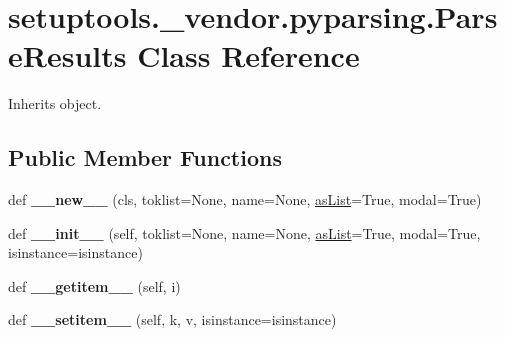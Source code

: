 \hypertarget{classsetuptools_1_1__vendor_1_1pyparsing_1_1_parse_results}{}\section{setuptools.\+\_\+vendor.\+pyparsing.\+Parse\+Results Class Reference}
\label{classsetuptools_1_1__vendor_1_1pyparsing_1_1_parse_results}


Inherits object.

\subsection*{Public Member Functions}
\begin{DoxyCompactItemize}
\item 
\mbox{\label{classsetuptools_1_1__vendor_1_1pyparsing_1_1_parse_results_a985e66ffeff9506a81ed9b13fee5f686}} 
def {\bfseries \+\_\+\+\_\+new\+\_\+\+\_\+} (cls, toklist=None, name=None, \hyperlink{classsetuptools_1_1__vendor_1_1pyparsing_1_1_parse_results_a8d1cc9ef72b2fcf972c240eae0e59e87}{as\+List}=True, modal=True)
\item 
\mbox{\label{classsetuptools_1_1__vendor_1_1pyparsing_1_1_parse_results_a7d7a395036e3c5e696230f1229bef36e}} 
def {\bfseries \+\_\+\+\_\+init\+\_\+\+\_\+} (self, toklist=None, name=None, \hyperlink{classsetuptools_1_1__vendor_1_1pyparsing_1_1_parse_results_a8d1cc9ef72b2fcf972c240eae0e59e87}{as\+List}=True, modal=True, isinstance=isinstance)
\item 
\mbox{\label{classsetuptools_1_1__vendor_1_1pyparsing_1_1_parse_results_ac67f6359e154955879ca3354b76c124a}} 
def {\bfseries \+\_\+\+\_\+getitem\+\_\+\+\_\+} (self, i)
\item 
\mbox{\label{classsetuptools_1_1__vendor_1_1pyparsing_1_1_parse_results_ae10b62f50b58cd72e321341128fc2ea0}} 
def {\bfseries \+\_\+\+\_\+setitem\+\_\+\+\_\+} (self, k, v, isinstance=isinstance)
\item 
\mbox{\label{classsetuptools_1_1__vendor_1_1pyparsing_1_1_parse_results_a31b99f9722ffb3b93d28b62449cb3bb2}} 

\end{DoxyCompactItemize}
